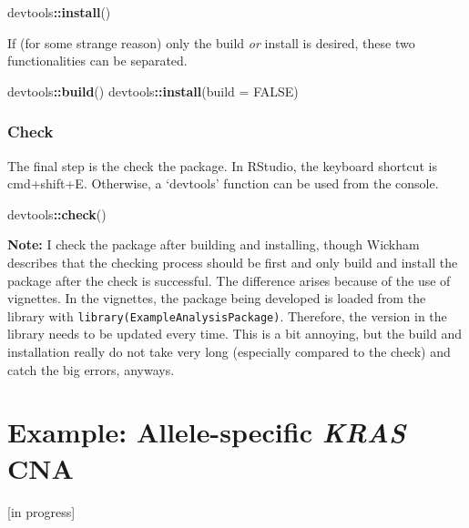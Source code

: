\documentclass[]{book}
\newenvironment{Shaded}{\begin{snugshade}}{\end{snugshade}}
\newcommand{\DataTypeTok}[1]{\textcolor[rgb]{0.13,0.29,0.53}{#1}}
\newcommand{\KeywordTok}[1]{\textcolor[rgb]{0.13,0.29,0.53}{\textbf{#1}}}
\newcommand{\NormalTok}[1]{#1}
\newcommand{\OperatorTok}[1]{\textcolor[rgb]{0.81,0.36,0.00}{\textbf{#1}}}
\newcommand{\OtherTok}[1]{\textcolor[rgb]{0.56,0.35,0.01}{#1}}
\begin{document}
\begin{Shaded}
\begin{Highlighting}[]
\NormalTok{devtools}\OperatorTok{::}\KeywordTok{install}\NormalTok{()}
\end{Highlighting}
\end{Shaded}

If (for some strange reason) only the build \emph{or} install is desired, these two functionalities can be separated.

\begin{Shaded}
\begin{Highlighting}[]
\NormalTok{devtools}\OperatorTok{::}\KeywordTok{build}\NormalTok{()}
\NormalTok{devtools}\OperatorTok{::}\KeywordTok{install}\NormalTok{(}\DataTypeTok{build =} \OtherTok{FALSE}\NormalTok{)}
\end{Highlighting}
\end{Shaded}

\hypertarget{check}{%
\subsection{Check}\label{check}}

The final step is the check the package. In RStudio, the keyboard shortcut is cmd+shift+E. Otherwise, a `devtools' function can be used from the console.

\begin{Shaded}
\begin{Highlighting}[]
\NormalTok{devtools}\OperatorTok{::}\KeywordTok{check}\NormalTok{()}
\end{Highlighting}
\end{Shaded}

\textbf{Note:} I check the package after building and installing, though Wickham describes that the checking process should be first and only build and install the package after the check is successful. The difference arises because of the use of vignettes. In the vignettes, the package being developed is loaded from the library with \texttt{library(ExampleAnalysisPackage)}. Therefore, the version in the library needs to be updated every time. This is a bit annoying, but the build and installation really do not take very long (especially compared to the check) and catch the big errors, anyways.

\hypertarget{example-allele-specific-kras-cna}{%
\chapter{\texorpdfstring{Example: Allele-specific \emph{KRAS} CNA}{Example: Allele-specific KRAS CNA}}\label{example-allele-specific-kras-cna}}

{[}in progress{]}


\end{document}
